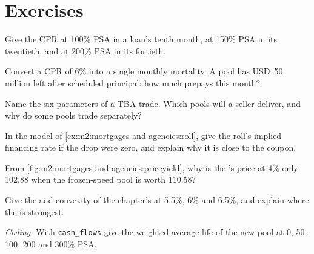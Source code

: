 \section{Exercises}

\begin{exercise}[$\star$]\label{exo:m2:mortgages-and-agencies:1}
Give the CPR at 100\% PSA in a loan's tenth month, at 150\% PSA in its
twentieth, and at 200\% PSA in its fortieth.
\end{exercise}

\begin{exercise}[$\star$]\label{exo:m2:mortgages-and-agencies:2}
Convert a CPR of 6\% into a single monthly mortality. A pool has USD~50
million left after scheduled principal: how much prepays this month?
\end{exercise}

\begin{exercise}[$\star$]\label{exo:m2:mortgages-and-agencies:3}
Name the six parameters of a TBA trade. Which pools will a seller deliver, and
why do some pools trade separately?
\end{exercise}

\begin{exercise}[$\star\star$]\label{exo:m2:mortgages-and-agencies:4}
In the model of \cref{ex:m2:mortgages-and-agencies:roll}, give the roll's
implied financing rate if the drop were zero, and explain why it is close to
the coupon.
\end{exercise}

\begin{exercise}[$\star\star$]\label{exo:m2:mortgages-and-agencies:5}
From \cref{fig:m2:mortgages-and-agencies:priceyield}, why is the
's price at 4\% only 102.88 when the frozen-speed pool is worth
110.58?
\end{exercise}

\begin{exercise}[$\star\star$]\label{exo:m2:mortgages-and-agencies:6}
Give the  and convexity of the chapter's  at
5.5\%, 6\% and 6.5\%, and explain where the  is strongest.
\end{exercise}

\begin{exercise}[$\star\star\star$]\label{exo:m2:mortgages-and-agencies:7}
\emph{Coding.} With \texttt{cash\_flows} give the weighted average life of the
new pool at 0, 50, 100, 200 and 300\% PSA.
\end{exercise}


